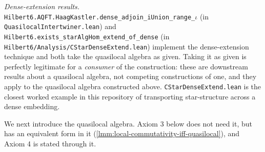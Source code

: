 \emph{Dense-extension results.} \texttt{Hilbert6.AQFT.HaagKastler.dense\_adjoin\_iUnion\_range\_\ensuremath{\iota}} (in \texttt{QuasilocalIntertwiner.lean}) and \texttt{Hilbert6.exists\_starAlgHom\_extend\_of\_dense} (in \texttt{Hilbert6/Analysis/CStarDenseExtend.lean}) implement the dense-extension technique and both take the quasilocal algebra as given. Taking it as given is perfectly legitimate for a \emph{consumer} of the construction: these are downstream results about a quasilocal algebra, not competing constructions of one, and they apply to the quasilocal algebra constructed above. \texttt{CStarDenseExtend.lean} is the closest worked example in this repository of transporting star-structure across a dense embedding.

We next introduce the quasilocal algebra. Axiom 3 below does not need it, but has an equivalent form in it (\ref{lmm:local-commutativity-iff-quasilocal}), and Axiom 4 is stated through it.

